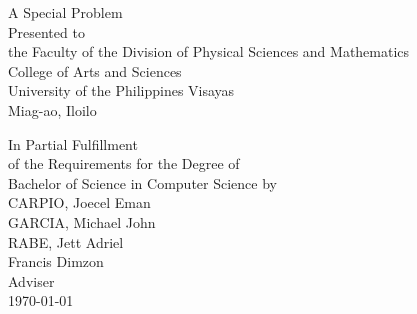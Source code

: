 \begin{titlepage}
\centering


\vspace{1.75cm}
A Special Problem\\
Presented to\\
the Faculty of the Division of Physical Sciences and Mathematics\\
College of Arts and Sciences\\
University of the Philippines Visayas\\
Miag-ao, Iloilo

\vspace{1.75cm}
In Partial Fulfillment\\
of the Requirements for the Degree of\\
Bachelor of Science in Computer Science
\vspace{1.75cm}
by\\

\vspace{1cm}
CARPIO, Joecel Eman  \\
GARCIA, Michael John  \\
RABE, Jett Adriel  \\

\vspace{1.75cm}
Francis Dimzon \\
Adviser\\



\vspace{1.75cm}
\today
\end{titlepage}
